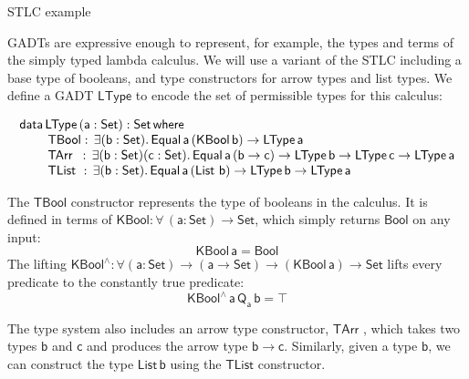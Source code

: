 \documentclass[acmsmall,screen,review,anonymous]{acmart}
\theoremstyle{definition}
\begin{document}
{\color{red} STLC example}

GADTs are expressive enough to represent, for example, the types and terms of the simply typed lambda calculus. 
We will use a variant of the STLC including a base type of booleans, and type constructors for arrow types and list types. 
We define a GADT $\mathsf{LType}$ to encode the set of permissible types for this calculus:

\begin{equation}\label{eq:eq_ltype}
\begin{array}{l}
\mathsf{data\, LType\,(a : Set) : Set\,where}\\
\mathsf{\;\;\;\;\;\;\;\;TBool :\, \exists (b : Set). \,Equal\,a\,(KBool\, b) \to LType\,a}\\
\mathsf{\;\;\;\;\;\;\;\;TArr\,\,\, :\, \exists (b : Set) (c : Set).\,Equal\,a\,(b \to c) \to LType\,b \to LType\,c \to LType\,a}\\
  \mathsf{\;\;\;\;\;\;\;\;TList\,\, :\, \exists (b : Set).\,Equal\,a\,(\mathsf{List}\,\,b) \to LType\,b \to LType\,a}
\end{array}
\end{equation}

The $\mathsf{TBool}$ constructor represents the type of booleans in the calculus. It is 
defined in terms of $\mathsf{KBool : \forall\, (a : Set) \to Set}$, which simply returns $\mathsf{Bool}$ on any input:
\[
  \mathsf{KBool \, a = Bool}
\]
The lifting $\mathsf{KBool^{\wedge} : \forall (a : Set) \to (a \to Set) \to (KBool \, a) \to Set}$ lifts every predicate to the constantly true predicate: 
\[
  \mathsf{KBool^{\wedge}\, a\, Q_a\, b = \top}
\]

The type system also includes an arrow type constructor, $\mathsf{TArr}$ , which takes two types $\mathsf{b}$ and $\mathsf{c}$
and produces the arrow type $\mathsf{b \to c}$. Similarly, given a type $\mathsf{b}$, we can construct 
the type $\mathsf{List\,b}$ using the $\mathsf{TList}$ constructor. 
\end{document}
